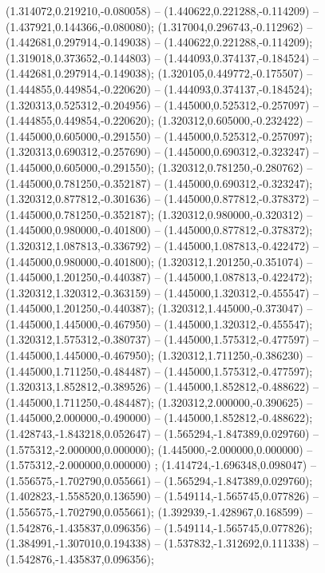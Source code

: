  (1.314072,0.219210,-0.080058) -- (1.440622,0.221288,-0.114209) -- (1.437921,0.144366,-0.080080);
 (1.317004,0.296743,-0.112962) -- (1.442681,0.297914,-0.149038) -- (1.440622,0.221288,-0.114209);
 (1.319018,0.373652,-0.144803) -- (1.444093,0.374137,-0.184524) -- (1.442681,0.297914,-0.149038);
 (1.320105,0.449772,-0.175507) -- (1.444855,0.449854,-0.220620) -- (1.444093,0.374137,-0.184524);
 (1.320313,0.525312,-0.204956) -- (1.445000,0.525312,-0.257097) -- (1.444855,0.449854,-0.220620);
 (1.320312,0.605000,-0.232422) -- (1.445000,0.605000,-0.291550) -- (1.445000,0.525312,-0.257097);
 (1.320313,0.690312,-0.257690) -- (1.445000,0.690312,-0.323247) -- (1.445000,0.605000,-0.291550);
 (1.320312,0.781250,-0.280762) -- (1.445000,0.781250,-0.352187) -- (1.445000,0.690312,-0.323247);
 (1.320312,0.877812,-0.301636) -- (1.445000,0.877812,-0.378372) -- (1.445000,0.781250,-0.352187);
 (1.320312,0.980000,-0.320312) -- (1.445000,0.980000,-0.401800) -- (1.445000,0.877812,-0.378372);
 (1.320312,1.087813,-0.336792) -- (1.445000,1.087813,-0.422472) -- (1.445000,0.980000,-0.401800);
 (1.320312,1.201250,-0.351074) -- (1.445000,1.201250,-0.440387) -- (1.445000,1.087813,-0.422472);
 (1.320312,1.320312,-0.363159) -- (1.445000,1.320312,-0.455547) -- (1.445000,1.201250,-0.440387);
 (1.320312,1.445000,-0.373047) -- (1.445000,1.445000,-0.467950) -- (1.445000,1.320312,-0.455547);
 (1.320312,1.575312,-0.380737) -- (1.445000,1.575312,-0.477597) -- (1.445000,1.445000,-0.467950);
 (1.320312,1.711250,-0.386230) -- (1.445000,1.711250,-0.484487) -- (1.445000,1.575312,-0.477597);
 (1.320313,1.852812,-0.389526) -- (1.445000,1.852812,-0.488622) -- (1.445000,1.711250,-0.484487);
 (1.320312,2.000000,-0.390625) -- (1.445000,2.000000,-0.490000) -- (1.445000,1.852812,-0.488622);
 (1.428743,-1.843218,0.052647) -- (1.565294,-1.847389,0.029760) -- (1.575312,-2.000000,0.000000);
 (1.445000,-2.000000,0.000000) -- (1.575312,-2.000000,0.000000) ;
 (1.414724,-1.696348,0.098047) -- (1.556575,-1.702790,0.055661) -- (1.565294,-1.847389,0.029760);
 (1.402823,-1.558520,0.136590) -- (1.549114,-1.565745,0.077826) -- (1.556575,-1.702790,0.055661);
 (1.392939,-1.428967,0.168599) -- (1.542876,-1.435837,0.096356) -- (1.549114,-1.565745,0.077826);
 (1.384991,-1.307010,0.194338) -- (1.537832,-1.312692,0.111338) -- (1.542876,-1.435837,0.096356);
